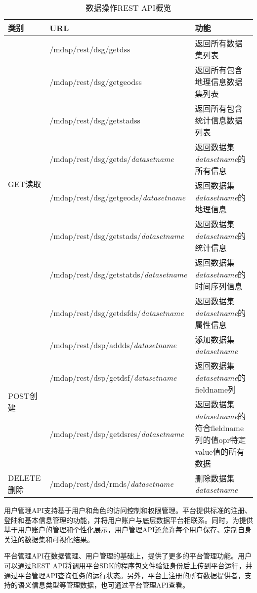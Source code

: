 \begin{table}
\centering
\caption{数据操作REST API概览}
\label{system:tab:restapi}
\begin{tabularx}{15cm}{|p{1.3cm}|l|X|} \hline
类别 & URL & 功能 \\ \hline
\multirow{8}{1.3cm}{GET读取} & /mdap/rest/dsg/getdss & 返回所有数据集列表\\ \cline{2-3} 
 & /mdap/rest/dsg/getgeodss & 返回所有包含地理信息数据集列表\\ \cline{2-3}
 & /mdap/rest/dsg/getstadss & 返回所有包含统计信息数据列表\\ \cline{2-3}
 & /mdap/rest/dsg/getds/\textit{datasetname} & 返回数据集\textit{datasetname}的所有信息\\ \cline{2-3}
 & /mdap/rest/dsg/getgeods/\textit{datasetname} & 返回数据集\textit{datasetname}的地理信息\\ \cline{2-3}
 & /mdap/rest/dsg/getstads/\textit{datasetname} & 返回数据集\textit{datasetname}的统计信息\\ \cline{2-3}
 & /mdap/rest/dsg/getstatds/\textit{datasetname} & 返回数据集\textit{datasetname}的时间序列信息\\ \cline{2-3}
 & /mdap/rest/dsg/getdsfds/\textit{datasetname} & 返回数据集\textit{datasetname}的属性信息 \\ \hline
\multirow{3}{1.3cm}{POST创建} & /mdap/rest/dsp/addds/\textit{datasetname} & 添加数据集\textit{datasetname}\\ \cline{2-3}
 & /mdap/rest/dsp/getdsf/\textit{datasetname} & 返回数据集\textit{datasetname}的fieldname列\\ \cline{2-3}
 & /mdap/rest/dsp/getdsres/\textit{datasetname} & 返回数据集\textit{datasetname}的符合fieldname列的值opr特定value值的所有数据 \\ \hline
DELETE删除 & /mdap/rest/dsd/rmds/\textit{datasetname} & 删除数据集\textit{datasetname} \\

\hline\end{tabularx}
\end{table}

用户管理API支持基于用户和角色的访问控制和权限管理。平台提供标准的注册、登陆和基本信息管理的功能，并将用户账户与底层数据平台相联系。同时，为提供基于用户账户的管理和个性化展示，用户管理API还允许每个用户保存、定制自身关注的数据集和可视化结果。

平台管理API在数据管理、用户管理的基础上，提供了更多的平台管理功能。用户可以通过REST API将调用平台SDK的程序包文件验证身份后上传到平台运行，并通过平台管理API查询任务的运行状态。另外，平台上注册的所有数据提供者，支持的语义信息类型等管理数据，也可通过平台管理API查看。

